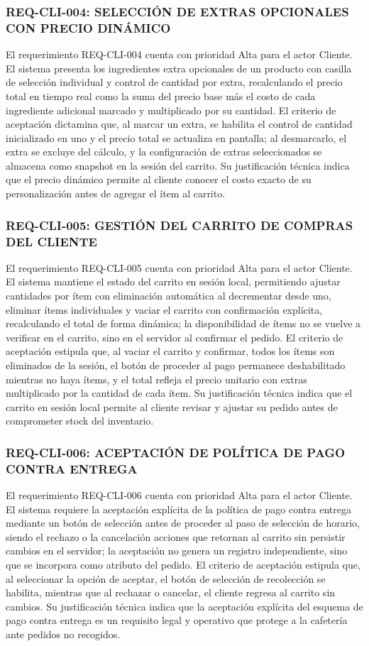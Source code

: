 \subsubsection{REQ-CLI-004: SELECCIÓN DE EXTRAS OPCIONALES CON PRECIO DINÁMICO}
El requerimiento REQ-CLI-004 cuenta con prioridad Alta para el actor Cliente. El sistema presenta los ingredientes extra opcionales de un producto con casilla de selección individual y control de cantidad por extra, recalculando el precio total en tiempo real como la suma del precio base más el costo de cada ingrediente adicional marcado y multiplicado por su cantidad. El criterio de aceptación dictamina que, al marcar un extra, se habilita el control de cantidad inicializado en uno y el precio total se actualiza en pantalla; al desmarcarlo, el extra se excluye del cálculo, y la configuración de extras seleccionados se almacena como snapshot en la sesión del carrito. Su justificación técnica indica que el precio dinámico permite al cliente conocer el costo exacto de su personalización antes de agregar el ítem al carrito.

\subsubsection{REQ-CLI-005: GESTIÓN DEL CARRITO DE COMPRAS DEL CLIENTE}
El requerimiento REQ-CLI-005 cuenta con prioridad Alta para el actor Cliente. El sistema mantiene el estado del carrito en sesión local, permitiendo ajustar cantidades por ítem con eliminación automática al decrementar desde uno, eliminar ítems individuales y vaciar el carrito con confirmación explícita, recalculando el total de forma dinámica; la disponibilidad de ítems no se vuelve a verificar en el carrito, sino en el servidor al confirmar el pedido. El criterio de aceptación estipula que, al vaciar el carrito y confirmar, todos los ítems son eliminados de la sesión, el botón de proceder al pago permanece deshabilitado mientras no haya ítems, y el total refleja el precio unitario con extras multiplicado por la cantidad de cada ítem. Su justificación técnica indica que el carrito en sesión local permite al cliente revisar y ajustar su pedido antes de comprometer stock del inventario.

\subsubsection{REQ-CLI-006: ACEPTACIÓN DE POLÍTICA DE PAGO CONTRA ENTREGA}
El requerimiento REQ-CLI-006 cuenta con prioridad Alta para el actor Cliente. El sistema requiere la aceptación explícita de la política de pago contra entrega mediante un botón de selección antes de proceder al paso de selección de horario, siendo el rechazo o la cancelación acciones que retornan al carrito sin persistir cambios en el servidor; la aceptación no genera un registro independiente, sino que se incorpora como atributo del pedido. El criterio de aceptación estipula que, al seleccionar la opción de aceptar, el botón de selección de recolección se habilita, mientras que al rechazar o cancelar, el cliente regresa al carrito sin cambios. Su justificación técnica indica que la aceptación explícita del esquema de pago contra entrega es un requisito legal y operativo que protege a la cafetería ante pedidos no recogidos.


